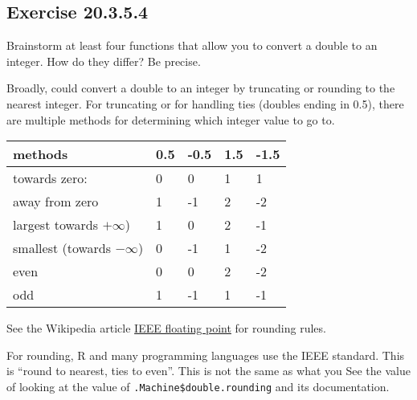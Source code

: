 \documentclass[]{book}
\newenvironment{Shaded}{\begin{snugshade}}{\end{snugshade}}
\newcommand{\CommentTok}[1]{\textcolor[rgb]{0.56,0.35,0.01}{\textit{#1}}}
\newcommand{\ControlFlowTok}[1]{\textcolor[rgb]{0.13,0.29,0.53}{\textbf{#1}}}
\newcommand{\DataTypeTok}[1]{\textcolor[rgb]{0.13,0.29,0.53}{#1}}
\newcommand{\DecValTok}[1]{\textcolor[rgb]{0.00,0.00,0.81}{#1}}
\newcommand{\FloatTok}[1]{\textcolor[rgb]{0.00,0.00,0.81}{#1}}
\newcommand{\KeywordTok}[1]{\textcolor[rgb]{0.13,0.29,0.53}{\textbf{#1}}}
\newcommand{\NormalTok}[1]{#1}
\newcommand{\OperatorTok}[1]{\textcolor[rgb]{0.81,0.36,0.00}{\textbf{#1}}}
\newcommand{\OtherTok}[1]{\textcolor[rgb]{0.56,0.35,0.01}{#1}}
\newcommand{\StringTok}[1]{\textcolor[rgb]{0.31,0.60,0.02}{#1}}
\theoremstyle{plain}
\theoremstyle{remark}
\begin{document}
\hypertarget{exercise-20.3.5.4}{%
\subsection*{\texorpdfstring{Exercise
{20.3.5.4}}{Exercise 20.3.5.4}}\label{exercise-20.3.5.4}}

Brainstorm at least four functions that allow you to convert a double to
an integer. How do they differ? Be precise.

Broadly, could convert a double to an integer by truncating or rounding
to the nearest integer. For truncating or for handling ties (doubles
ending in 0.5), there are multiple methods for determining which integer
value to go to.

\begin{longtable}[]{@{}lllll@{}}
\toprule
methods & 0.5 & -0.5 & 1.5 & -1.5\tabularnewline
\midrule
\endhead
towards zero: & 0 & 0 & 1 & 1\tabularnewline
away from zero & 1 & -1 & 2 & -2\tabularnewline
largest towards \(+\infty\)) & 1 & 0 & 2 & -1\tabularnewline
smallest (towards \(-\infty\)) & 0 & -1 & 1 & -2\tabularnewline
even & 0 & 0 & 2 & -2\tabularnewline
odd & 1 & -1 & 1 & -1\tabularnewline
\bottomrule
\end{longtable}

See the Wikipedia article
\href{https://en.wikipedia.org/wiki/IEEE_floating_point}{IEEE floating
point} for rounding rules.

For rounding, R and many programming languages use the IEEE standard.
This is ``round to nearest, ties to even''. This is not the same as what
you See the value of looking at the value of
\texttt{.Machine\$double.rounding} and its documentation.

\begin{Shaded}
\end{Shaded}
\end{document}
